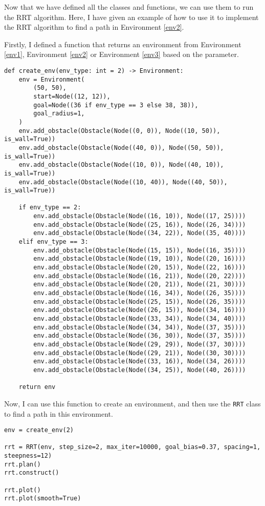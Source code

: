 \documentclass[12pt]{report}
\begin{document}
Now that we have defined all the classes and functions, we can use them to run the RRT algorithm. Here, I have given an example of how to use it to implement the RRT algorithm to find a path in Environment \ref{env2}.

Firstly, I defined a function that returns an environment from Environment \ref{env1}, Environment \ref{env2} or Environment \ref{env3} based on the parameter.
\begin{lstlisting}[caption={\texttt{create\_env}}]
def create_env(env_type: int = 2) -> Environment:
    env = Environment(
        (50, 50),
        start=Node((12, 12)),
        goal=Node((36 if env_type == 3 else 38, 38)),
        goal_radius=1,
    )
    env.add_obstacle(Obstacle(Node((0, 0)), Node((10, 50)), is_wall=True))
    env.add_obstacle(Obstacle(Node((40, 0)), Node((50, 50)), is_wall=True))
    env.add_obstacle(Obstacle(Node((10, 0)), Node((40, 10)), is_wall=True))
    env.add_obstacle(Obstacle(Node((10, 40)), Node((40, 50)), is_wall=True))

    if env_type == 2:
        env.add_obstacle(Obstacle(Node((16, 10)), Node((17, 25))))
        env.add_obstacle(Obstacle(Node((25, 16)), Node((26, 34))))
        env.add_obstacle(Obstacle(Node((34, 22)), Node((35, 40))))
    elif env_type == 3:
        env.add_obstacle(Obstacle(Node((15, 15)), Node((16, 35))))
        env.add_obstacle(Obstacle(Node((19, 10)), Node((20, 16))))
        env.add_obstacle(Obstacle(Node((20, 15)), Node((22, 16))))
        env.add_obstacle(Obstacle(Node((16, 21)), Node((20, 22))))
        env.add_obstacle(Obstacle(Node((20, 21)), Node((21, 30))))
        env.add_obstacle(Obstacle(Node((16, 34)), Node((26, 35))))
        env.add_obstacle(Obstacle(Node((25, 15)), Node((26, 35))))
        env.add_obstacle(Obstacle(Node((26, 15)), Node((34, 16))))
        env.add_obstacle(Obstacle(Node((33, 34)), Node((34, 40))))
        env.add_obstacle(Obstacle(Node((34, 34)), Node((37, 35))))
        env.add_obstacle(Obstacle(Node((36, 30)), Node((37, 35))))
        env.add_obstacle(Obstacle(Node((29, 29)), Node((37, 30))))
        env.add_obstacle(Obstacle(Node((29, 21)), Node((30, 30))))
        env.add_obstacle(Obstacle(Node((33, 16)), Node((34, 26))))
        env.add_obstacle(Obstacle(Node((34, 25)), Node((40, 26))))

    return env
\end{lstlisting}

Now, I can use this function to create an environment, and then use the \texttt{RRT} class to find a path in this environment.
\begin{lstlisting}[caption={Usage}]
env = create_env(2)

rrt = RRT(env, step_size=2, max_iter=10000, goal_bias=0.37, spacing=1, steepness=12)
rrt.plan()
rrt.construct()

rrt.plot()
rrt.plot(smooth=True)
\end{lstlisting}
\end{document}
